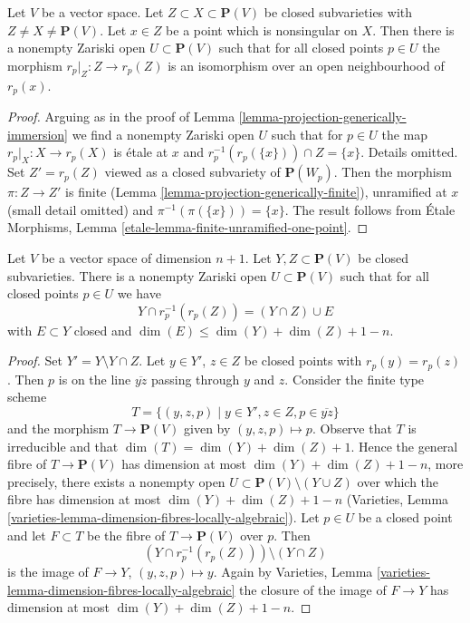 \begin{lemma}
\label{lemma-projection-generically-immersion-refined}
Let $V$ be a vector space. Let $Z \subset X \subset \mathbf{P}(V)$ be closed
subvarieties with $Z \not = X \not = \mathbf{P}(V)$. Let $x \in Z$ be a point
which is nonsingular on $X$. Then there is a nonempty Zariski open
$U \subset \mathbf{P}(V)$ such that for all closed points $p \in U$ the
morphism $r_p|_Z : Z \to r_p(Z)$ is an isomorphism over an open neighbourhood
of $r_p(x)$.
\end{lemma}

\begin{proof}
Arguing as in the proof of Lemma \ref{lemma-projection-generically-immersion}
we find a nonempty Zariski open $U$ such that for $p \in U$ the map
$r_p|_X : X \to r_p(X)$ is \'etale at $x$ and
$r_p^{-1}(r_p(\{x\})) \cap Z = \{x\}$. Details omitted.
Set $Z' = r_p(Z)$ viewed as a closed subvariety of $\mathbf{P}(W_p)$.
Then the morphism $\pi : Z \to Z'$ is finite
(Lemma \ref{lemma-projection-generically-finite}), unramified at $x$
(small detail omitted) and $\pi^{-1}(\pi(\{x\})) = \{x\}$. The result follows
from \'Etale Morphisms, Lemma \ref{etale-lemma-finite-unramified-one-point}.
\end{proof}

\begin{lemma}
\label{lemma-projection-injective}
Let $V$ be a vector space of dimension $n + 1$.
Let $Y, Z \subset \mathbf{P}(V)$ be closed subvarieties.
There is a nonempty Zariski open $U \subset \mathbf{P}(V)$
such that for all closed points $p \in U$ we have
$$
Y \cap r_p^{-1}(r_p(Z)) = (Y \cap Z) \cup E
$$
with $E \subset Y$ closed and
$\dim(E) \leq \dim(Y) + \dim(Z) + 1 - n$.
\end{lemma}

\begin{proof}
Set $Y' = Y \setminus Y \cap Z$.
Let $y \in Y'$, $z \in Z$ be closed points with $r_p(y) = r_p(z)$.
Then $p$ is on the line $\overline{yz}$ passing through $y$ and $z$.
Consider the finite type scheme
$$
T = \{(y, z, p) \mid y \in Y', z \in Z, p \in \overline{yz}\}
$$
and the morphism $T \to \mathbf{P}(V)$ given by $(y, z, p) \mapsto p$.
Observe that $T$ is irreducible and that $\dim(T) = \dim(Y) + \dim(Z) + 1$.
Hence the general fibre of $T \to \mathbf{P}(V)$ has dimension at most
$\dim(Y) + \dim(Z) + 1 - n$, more precisely, there exists a nonempty
open $U \subset \mathbf{P}(V) \setminus (Y \cup Z)$ over
which the fibre has dimension at most $\dim(Y) + \dim(Z) + 1 - n$
(Varieties, Lemma \ref{varieties-lemma-dimension-fibres-locally-algebraic}).
Let $p \in U$ be a closed point and let $F \subset T$ be the fibre
of $T \to \mathbf{P}(V)$ over $p$. Then
$$
(Y \cap r_p^{-1}(r_p(Z))) \setminus (Y \cap Z)
$$
is the image of $F \to Y$, $(y, z, p) \mapsto y$. Again by
Varieties, Lemma \ref{varieties-lemma-dimension-fibres-locally-algebraic}
the closure of the image of $F \to Y$ has dimension at most
$\dim(Y) + \dim(Z) + 1 - n$.
\end{proof}

